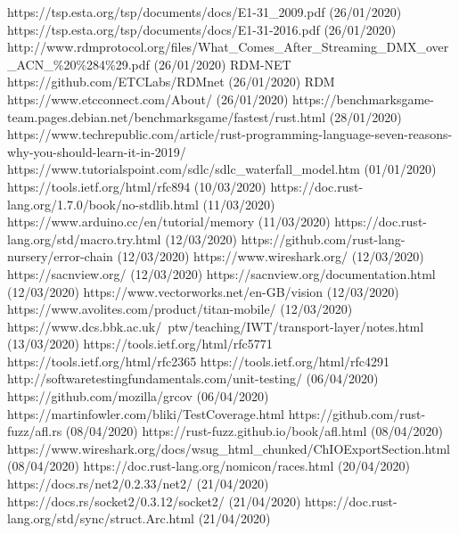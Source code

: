 \documentclass[11pt,a4paper]{article}
\begin{document}
\begin{thebibliography}{9}
	https://tsp.esta.org/tsp/documents/docs/E1-31\_2009.pdf
	(26/01/2020)
	https://tsp.esta.org/tsp/documents/docs/E1-31-2016.pdf
	(26/01/2020)
	http://www.rdmprotocol.org/files/What\_Comes\_After\_Streaming\_DMX\_over\_ACN\_\%20\%284\%29.pdf (26/01/2020)
	RDM-NET
	https://github.com/ETCLabs/RDMnet (26/01/2020)
	RDM
	https://www.etcconnect.com/About/ (26/01/2020)
	https://benchmarksgame-team.pages.debian.net/benchmarksgame/fastest/rust.html (28/01/2020)
	https://www.techrepublic.com/article/rust-programming-language-seven-reasons-why-you-should-learn-it-in-2019/
	https://www.tutorialspoint.com/sdlc/sdlc\_waterfall\_model.htm (01/01/2020)
	https://tools.ietf.org/html/rfc894 (10/03/2020)
	https://doc.rust-lang.org/1.7.0/book/no-stdlib.html (11/03/2020)
	https://www.arduino.cc/en/tutorial/memory (11/03/2020)
	https://doc.rust-lang.org/std/macro.try.html (12/03/2020)
	https://github.com/rust-lang-nursery/error-chain (12/03/2020)
	https://www.wireshark.org/ (12/03/2020)		
	https://sacnview.org/ (12/03/2020)
	https://sacnview.org/documentation.html (12/03/2020)
	https://www.vectorworks.net/en-GB/vision (12/03/2020)
	https://www.avolites.com/product/titan-mobile/ (12/03/2020)
	https://www.dcs.bbk.ac.uk/~ptw/teaching/IWT/transport-layer/notes.html (13/03/2020)
	https://tools.ietf.org/html/rfc5771
	https://tools.ietf.org/html/rfc2365
	https://tools.ietf.org/html/rfc4291
	http://softwaretestingfundamentals.com/unit-testing/ (06/04/2020)
	https://github.com/mozilla/grcov (06/04/2020)
	https://martinfowler.com/bliki/TestCoverage.html
	https://github.com/rust-fuzz/afl.rs (08/04/2020)
	https://rust-fuzz.github.io/book/afl.html (08/04/2020)
	https://www.wireshark.org/docs/wsug\_html\_chunked/ChIOExportSection.html (08/04/2020)
	https://doc.rust-lang.org/nomicon/races.html (20/04/2020)
	https://docs.rs/net2/0.2.33/net2/ (21/04/2020)
	https://docs.rs/socket2/0.3.12/socket2/ (21/04/2020)
	https://doc.rust-lang.org/std/sync/struct.Arc.html (21/04/2020)
\end{thebibliography}
\end{document}
